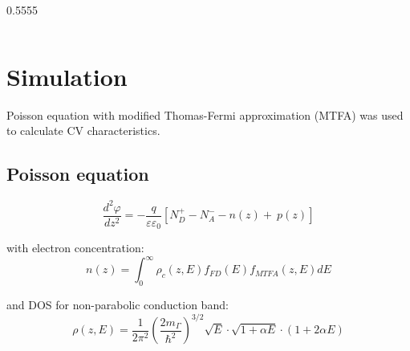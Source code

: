 \documentclass[final]{beamer}
\newcommand{\figfont}{\normalsize} %
\begin{document}
\begin{poster}
\vspace{3ex}
\begin{columns}
    \figfont
    \newcommand{\figwidth}{0.5555\columnwidth}
    \begin{column}{\figwidth}
    \end{column}
    \begin{column}{\columnwidth-\figwidth}
        
    \end{column}
\end{columns}
\vspace{-2ex}
\section{Simulation} \justifying

Poisson equation with modified Thomas-Fermi approximation (MTFA) was used to calculate CV characteristics.
\vspace*{-2ex}

\subsection{Poisson equation}

    $$
        \frac{d^2\varphi}{dz^2} =
         -\frac{q}{\varepsilon\varepsilon_0}\left[N_D^+ - N_A^- - n(z) + \
          p(z)\right] 
    $$
    
    with electron concentration:
    $$
        n(z) = \int_{0}^{\infty}\rho_c(z,E) f_{FD}(E) f_{MTFA}(z,E)dE
    $$ 
    
    and  DOS for non-parabolic conduction band:  
    $$
        \rho \left(z,E\right) = \frac{1}{2\pi^2} \left(\frac{2m_{\Gamma}}{\hbar^2}\right)^{3/2} \!\!\! \sqrt{E} \cdot \sqrt{1+\alpha E} \cdot \left(1+ 2\alpha E \right)
    $$  
    


\end{poster}
\end{document}
